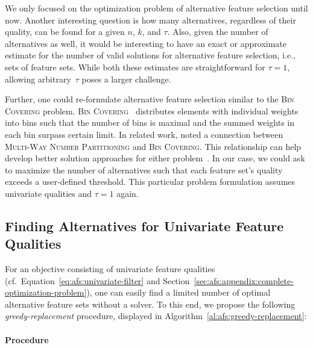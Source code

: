 \documentclass{article}
\theoremstyle{definition}
\begin{document}
We only focused on the optimization problem of alternative feature selection until now.
Another interesting question is how many alternatives, regardless of their quality, can be found for a given $n$, $k$, and $\tau$.
Also, given the number of alternatives as well, it would be interesting to have an exact or approximate estimate for the number of valid solutions for alternative feature selection, i.e., sets of feature sets.
While both these estimates are straightforward for $\tau = 1$, allowing arbitrary~$\tau$ poses a larger challenge.

Further, one could re-formulate alternative feature selection similar to the \textsc{Bin Covering} problem.
\textsc{Bin Covering}~\cite{assmann1984dual} distributes elements with individual weights into bins such that the number of bins is maximal and the summed weights in each bin surpass certain limit.
In related work, \cite{lawrinenko2017identical} noted a connection between \textsc{Multi-Way Number Partitioning} and \textsc{Bin Covering}.
This relationship can help develop better solution approaches for either problem~\cite{walter2017lower, walter2017improved}.
In our case, we could ask to maximize the number of alternatives such that each feature set's quality exceeds a user-defined threshold.
This particular problem formulation assumes univariate qualities and $\tau=1$ again.

\subsection{Finding Alternatives for Univariate Feature Qualities}
\label{sec:afs:appendix:univariate-search-algorithm}

For an objective consisting of univariate feature qualities (cf.~Equation~\ref{eq:afs:univariate-filter} and Section~\ref{sec:afs:appendix:complete-optimization-problem}), one can easily find a limited number of optimal alternative feature sets without a solver.
To this end, we propose the following \emph{greedy-replacement} procedure, displayed in Algorithm~\ref{al:afs:greedy-replacement}:

\paragraph{Procedure}
\end{document}
